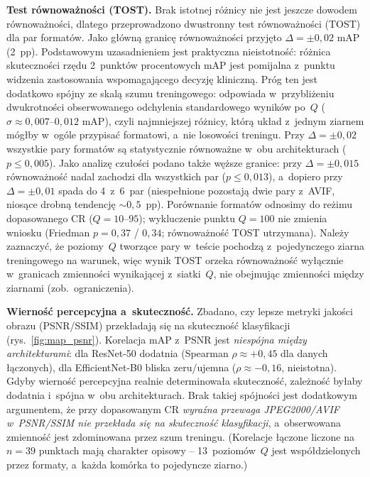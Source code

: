 \documentclass[12pt,a4paper]{article}
\begin{document}
\textbf{Test równoważności (TOST).} Brak istotnej różnicy nie jest jeszcze dowodem równoważności, dlatego przeprowadzono dwustronny test równoważności (TOST) dla par formatów. Jako główną granicę równoważności przyjęto $\Delta = \pm 0{,}02$ mAP (2~pp). Podstawowym uzasadnieniem jest praktyczna nieistotność: różnica skuteczności rzędu 2~punktów procentowych mAP jest pomijalna z~punktu widzenia zastosowania wspomagającego decyzję kliniczną. Próg ten jest dodatkowo spójny ze skalą szumu treningowego: odpowiada w~przybliżeniu dwukrotności obserwowanego odchylenia standardowego wyników po~$Q$ ($\sigma \approx 0{,}007$--$0{,}012$ mAP), czyli najmniejszej różnicy, którą układ z~jednym ziarnem mógłby w~ogóle przypisać formatowi, a~nie losowości treningu. Przy $\Delta = \pm 0{,}02$ wszystkie pary formatów są statystycznie równoważne w~obu architekturach ($p \le 0{,}005$). Jako analizę czułości podano także węższe granice: przy $\Delta = \pm 0{,}015$ równoważność nadal zachodzi dla wszystkich par ($p \le 0{,}013$), a~dopiero przy $\Delta = \pm 0{,}01$ spada do 4~z~6~par (niespełnione pozostają dwie pary z~AVIF, niosące drobną tendencję $\sim 0{,}5$~pp). Porównanie formatów odnosimy do reżimu dopasowanego CR ($Q = 10$--$95$); wykluczenie punktu $Q=100$ nie zmienia wniosku (Friedman $p=0{,}37$ / $0{,}34$; równoważność TOST utrzymana). Należy zaznaczyć, że poziomy~$Q$ tworzące pary w~teście pochodzą z~pojedynczego ziarna treningowego na warunek, więc wynik TOST orzeka równoważność wyłącznie w~granicach zmienności wynikającej z~siatki~$Q$, nie obejmując zmienności między ziarnami (zob.~ograniczenia).

\textbf{Wierność percepcyjna a~skuteczność.} Zbadano, czy lepsze metryki jakości obrazu (PSNR/SSIM) przekładają się na skuteczność klasyfikacji (rys.~\ref{fig:map_psnr}). Korelacja mAP z~PSNR jest \emph{niespójna między architekturami}: dla ResNet-50 dodatnia (Spearman $\rho \approx +0{,}45$ dla danych łączonych), dla EfficientNet-B0 bliska zeru/ujemna ($\rho \approx -0{,}16$, nieistotna). Gdyby wierność percepcyjna realnie determinowała skuteczność, zależność byłaby dodatnia i~spójna w~obu architekturach. Brak takiej spójności jest dodatkowym argumentem, że przy dopasowanym CR \emph{wyraźna przewaga JPEG2000/AVIF w~PSNR/SSIM nie przekłada się na skuteczność klasyfikacji}, a~obserwowana zmienność jest zdominowana przez szum treningu. (Korelacje łączone liczone na $n=39$ punktach mają charakter opisowy -- 13~poziomów~$Q$ jest współdzielonych przez formaty, a~każda komórka to pojedyncze ziarno.)
\end{document}
